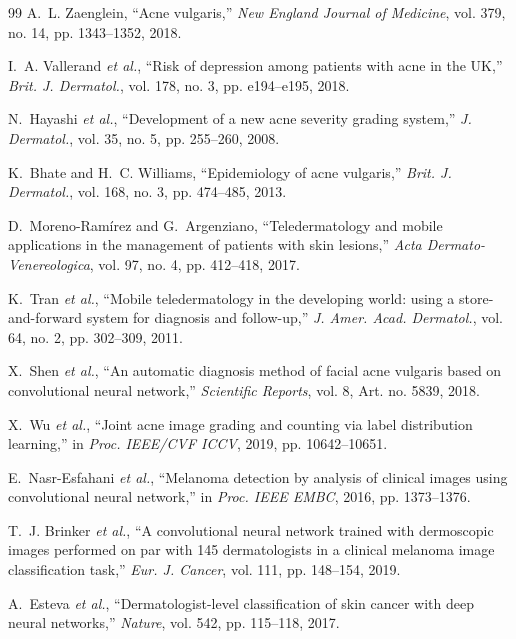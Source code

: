 \documentclass[10pt,conference]{IEEEtran}
\begin{document}
\begin{thebibliography}{99}
A.~L. Zaenglein, ``Acne vulgaris,'' \emph{New England Journal of Medicine}, vol. 379, no. 14, pp. 1343--1352, 2018.

I.~A. Vallerand \emph{et al.}, ``Risk of depression among patients with acne in the UK,'' \emph{Brit. J. Dermatol.}, vol. 178, no. 3, pp. e194--e195, 2018.

N.~Hayashi \emph{et al.}, ``Development of a new acne severity grading system,'' \emph{J. Dermatol.}, vol. 35, no. 5, pp. 255--260, 2008.

K.~Bhate and H.~C. Williams, ``Epidemiology of acne vulgaris,'' \emph{Brit. J. Dermatol.}, vol. 168, no. 3, pp. 474--485, 2013.

D.~Moreno-Ram{\'i}rez and G.~Argenziano, ``Teledermatology and mobile applications in the management of patients with skin lesions,'' \emph{Acta Dermato-Venereologica}, vol. 97, no. 4, pp. 412--418, 2017.

K.~Tran \emph{et al.}, ``Mobile teledermatology in the developing world: using a store-and-forward system for diagnosis and follow-up,'' \emph{J. Amer. Acad. Dermatol.}, vol. 64, no. 2, pp. 302--309, 2011.

X.~Shen \emph{et al.}, ``An automatic diagnosis method of facial acne vulgaris based on convolutional neural network,'' \emph{Scientific Reports}, vol. 8, Art. no. 5839, 2018.

X.~Wu \emph{et al.}, ``Joint acne image grading and counting via label distribution learning,'' in \emph{Proc. IEEE/CVF ICCV}, 2019, pp. 10642--10651.

E.~Nasr-Esfahani \emph{et al.}, ``Melanoma detection by analysis of clinical images using convolutional neural network,'' in \emph{Proc. IEEE EMBC}, 2016, pp. 1373--1376.

T.~J. Brinker \emph{et al.}, ``A convolutional neural network trained with dermoscopic images performed on par with 145 dermatologists in a clinical melanoma image classification task,'' \emph{Eur. J. Cancer}, vol. 111, pp. 148--154, 2019.

A.~Esteva \emph{et al.}, ``Dermatologist-level classification of skin cancer with deep neural networks,'' \emph{Nature}, vol. 542, pp. 115--118, 2017.


\end{thebibliography}
\end{document}
